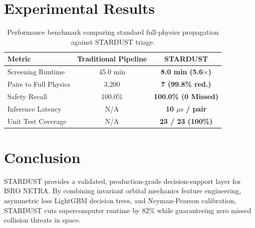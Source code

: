 \documentclass[10pt,twocolumn,a4paper]{article}
\begin{document}
\section{Experimental Results}

\begin{table}[h]
\centering
\small
\begin{tabular}{@{}lcc@{}}
\toprule
\textbf{Metric} & \textbf{Traditional Pipeline} & \textbf{STARDUST} \\ \midrule
Screening Runtime & 45.0 min & \textbf{8.0 min (5.6$\times$)} \\
Pairs to Full Physics & 3,200 & \textbf{7 (99.8\% red.)} \\
Safety Recall & 100.0\% & \textbf{100.0\% (0 Missed)} \\
Inference Latency & N/A & \textbf{10 $\mu\text{s}$ / pair} \\
Unit Test Coverage & N/A & \textbf{23 / 23 (100\%)} \\ \bottomrule
\end{tabular}
\caption{Performance benchmark comparing standard full-physics propagation against STARDUST triage.}
\end{table}

\section{Conclusion}
STARDUST provides a validated, production-grade decision-support layer for ISRO NETRA. By combining invariant orbital mechanics feature engineering, asymmetric loss LightGBM decision trees, and Neyman-Pearson calibration, STARDUST cuts supercomputer runtime by 82\% while guaranteeing zero missed collision threats in space.
\end{document}
